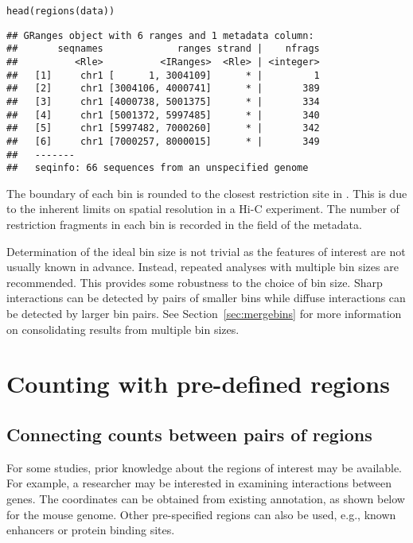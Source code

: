 \documentclass{report}\usepackage[]{graphicx}\usepackage[usenames,dvipsnames]{color}
\newcommand{\hlstd}[1]{\textcolor[rgb]{0.251,0.251,0.251}{#1}}%
\newcommand{\hlkwd}[1]{\textcolor[rgb]{0.878,0.439,0.125}{#1}}%
\newenvironment{knitrout}{}{} %
\begin{document}
\begin{knitrout}
\color{fgcolor}\begin{kframe}
\begin{alltt}
\hlkwd{head}\hlstd{(}\hlkwd{regions}\hlstd{(data))}
\end{alltt}
\begin{verbatim}
## GRanges object with 6 ranges and 1 metadata column:
##       seqnames             ranges strand |    nfrags
##          <Rle>          <IRanges>  <Rle> | <integer>
##   [1]     chr1 [      1, 3004109]      * |         1
##   [2]     chr1 [3004106, 4000741]      * |       389
##   [3]     chr1 [4000738, 5001375]      * |       334
##   [4]     chr1 [5001372, 5997485]      * |       340
##   [5]     chr1 [5997482, 7000260]      * |       342
##   [6]     chr1 [7000257, 8000015]      * |       349
##   -------
##   seqinfo: 66 sequences from an unspecified genome
\end{verbatim}
\end{kframe}
\end{knitrout}

The boundary of each bin is rounded to the closest restriction site in .
This is due to the inherent limits on spatial resolution in a Hi-C experiment.
The number of restriction fragments in each bin is recorded in the  field of the metadata.

Determination of the ideal bin size is not trivial as the features of interest are not usually known in advance.
Instead, repeated analyses with multiple bin sizes are recommended.
This provides some robustness to the choice of bin size.
Sharp interactions can be detected by pairs of smaller bins while diffuse interactions can be detected by larger bin pairs.
See Section~\ref{sec:mergebins} for more information on consolidating results from multiple bin sizes.

\section{Counting with pre-defined regions}

\subsection{Connecting counts between pairs of regions}
For some studies, prior knowledge about the regions of interest may be available.
For example, a researcher may be interested in examining interactions between genes.
The coordinates can be obtained from existing annotation, as shown below for the mouse genome.
Other pre-specified regions can also be used, e.g., known enhancers or protein binding sites.
\end{document}
